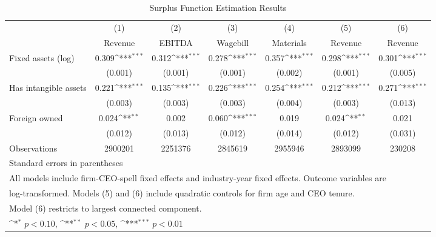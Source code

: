 \begin{table}[htbp]\centering
\def\sym#1{\ifmmode^{#1}\else\(^{#1}\)\fi}
\caption{Surplus Function Estimation Results}
\begin{tabular}{l*{6}{c}}
\toprule
                    &\multicolumn{1}{c}{(1)}&\multicolumn{1}{c}{(2)}&\multicolumn{1}{c}{(3)}&\multicolumn{1}{c}{(4)}&\multicolumn{1}{c}{(5)}&\multicolumn{1}{c}{(6)}\\
                    &\multicolumn{1}{c}{Revenue}&\multicolumn{1}{c}{EBITDA}&\multicolumn{1}{c}{Wagebill}&\multicolumn{1}{c}{Materials}&\multicolumn{1}{c}{Revenue}&\multicolumn{1}{c}{Revenue}\\
\midrule
Fixed assets (log)  &       0.309\sym{***}&       0.312\sym{***}&       0.278\sym{***}&       0.357\sym{***}&       0.298\sym{***}&       0.301\sym{***}\\
                    &     (0.001)         &     (0.001)         &     (0.001)         &     (0.002)         &     (0.001)         &     (0.005)         \\
\addlinespace
Has intangible assets&       0.221\sym{***}&       0.135\sym{***}&       0.226\sym{***}&       0.254\sym{***}&       0.212\sym{***}&       0.271\sym{***}\\
                    &     (0.003)         &     (0.003)         &     (0.003)         &     (0.004)         &     (0.003)         &     (0.013)         \\
\addlinespace
Foreign owned       &       0.024\sym{**} &       0.002         &       0.060\sym{***}&       0.019         &       0.024\sym{**} &       0.021         \\
                    &     (0.012)         &     (0.013)         &     (0.012)         &     (0.014)         &     (0.012)         &     (0.031)         \\
\midrule
Observations        &     2900201         &     2251376         &     2845619         &     2955946         &     2893099         &      230208         \\
\bottomrule
\multicolumn{7}{l}{\footnotesize Standard errors in parentheses}\\
\multicolumn{7}{l}{\footnotesize All models include firm-CEO-spell fixed effects and industry-year fixed effects. Outcome variables are}\\
\multicolumn{7}{l}{\footnotesize log-transformed. Models (5) and (6) include quadratic controls for firm age and CEO tenure.}\\
\multicolumn{7}{l}{\footnotesize Model (6) restricts to largest connected component.}\\
\multicolumn{7}{l}{\footnotesize \sym{*} \(p<0.10\), \sym{**} \(p<0.05\), \sym{***} \(p<0.01\)}\\
\end{tabular}
\end{table}
